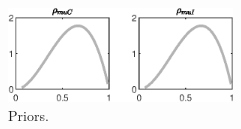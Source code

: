 \begin{figure}[H]
\centering
\includegraphics[width=0.53\textwidth]{BRS_sectoral_artificial_data/graphs/BRS_sectoral_artificial_data_Priors4}
\caption{Priors.}\label{Fig:Priors:4}
\end{figure}
 
